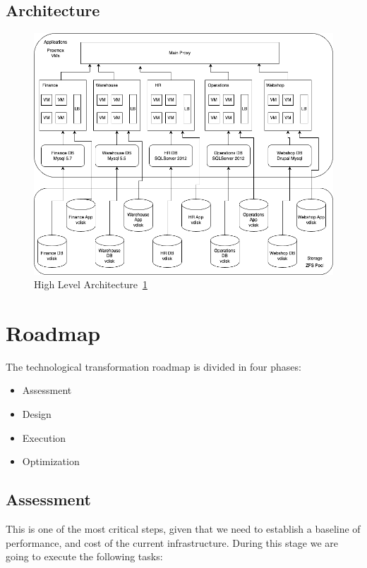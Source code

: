 \documentclass{llncs}
\begin{document}
\newpage

\subsection{Architecture}

\begin{figure}[htbp]
  \begin{center}
    \includegraphics[width=12cm]{diagrams/architecture.drawio.png}
    \caption{High Level Architecture~\ref{High_Level_Architecture}}
    \label{High_Level_Architecture} %
  \end{center}
\end{figure}

\section{Roadmap}

The technological transformation roadmap is divided in four phases:
\begin{itemize}
  \item Assessment
  \item Design
  \item Execution
  \item Optimization
\end{itemize}

\subsection{Assessment}
This is one of the most critical steps, given that we need to establish a baseline of performance, and cost of the current infrastructure. During this stage we are going to execute the following tasks:
\end{document}
